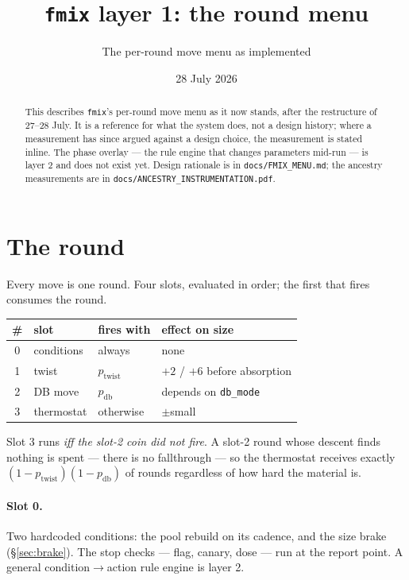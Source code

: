 \documentclass[11pt]{article}
\title{\texttt{fmix} layer 1: the round menu}
\author{The per-round move menu as implemented}
\date{28 July 2026}
\begin{document}
\maketitle

\begin{abstract}
\noindent This describes \texttt{fmix}'s per-round move menu as it now stands,
after the restructure of 27--28 July. It is a reference for what the system
does, not a design history; where a measurement has since argued against a
design choice, the measurement is stated inline. The phase overlay --- the rule
engine that changes parameters mid-run --- is layer 2 and does not exist yet.
Design rationale is in \texttt{docs/FMIX_MENU.md}; the ancestry measurements are
in \texttt{docs/ANCESTRY_INSTRUMENTATION.pdf}.
\end{abstract}

\section{The round}

Every move is one round. Four slots, evaluated in order; the first that fires
consumes the round.

\begin{center}
\begin{tabular}{clll}
\toprule
\# & slot & fires with & effect on size \\
\midrule
0 & conditions & always & none \\
1 & twist & $p_{\text{twist}}$ & $+2$ / $+6$ before absorption \\
2 & DB move & $p_{\text{db}}$ & depends on \texttt{db_mode} \\
3 & thermostat & otherwise & $\pm$small \\
\bottomrule
\end{tabular}
\end{center}

Slot 3 runs \emph{iff the slot-2 coin did not fire}. A slot-2 round whose
descent finds nothing is spent --- there is no fallthrough --- so the thermostat
receives exactly $(1-p_{\text{twist}})(1-p_{\text{db}})$ of rounds regardless of
how hard the material is.

\paragraph{Slot 0.} Two hardcoded conditions: the pool rebuild on its cadence,
and the size brake (\S\ref{sec:brake}). The stop checks --- flag, canary, dose
--- run at the report point. A general condition$\to$action rule engine is layer 2.
\end{document}
